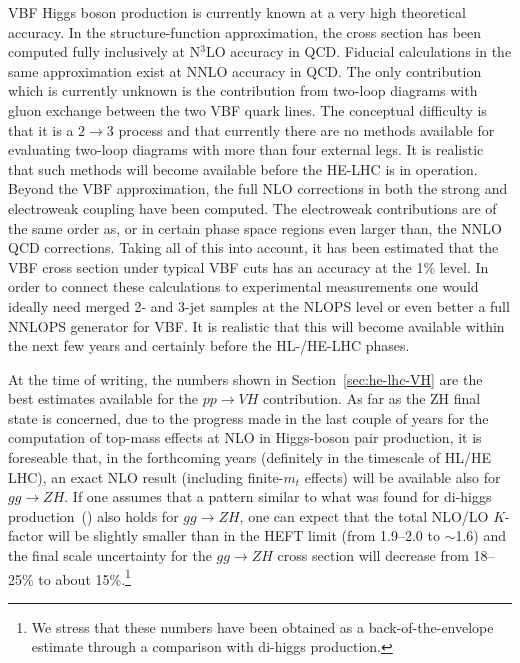VBF Higgs boson production is currently known at a very high theoretical accuracy. In
the structure-function approximation, the cross section has been computed fully inclusively at
N$^3$LO accuracy in QCD. Fiducial calculations in the same approximation exist at NNLO accuracy in QCD. The
only contribution which is currently unknown is the contribution from two-loop
diagrams with gluon exchange between the two VBF quark lines. The conceptual
difficulty is that it is a $2 \to 3$ process and that currently there are no methods
available for evaluating two-loop diagrams with more than four external legs. It is
realistic that such methods will become available before the HE-LHC is in
operation. Beyond the VBF approximation, the full NLO corrections in both the
strong and electroweak coupling have been computed. The electroweak
contributions are of the same order as, or in certain phase space regions even
larger than, the NNLO QCD corrections. Taking all of this into account, it has
been estimated that the VBF cross section under typical VBF cuts has an accuracy
at the 1\% level. In order to connect these calculations to experimental
measurements one would ideally need merged 2- and 3-jet samples at the NLOPS
level or even better a full NNLOPS generator for VBF. It is realistic that this
will become available within the next few years and certainly before the
HL-/HE-LHC phases.
 


\label{sec:hl-lhc-VH}
At the time of writing, the numbers shown in Section~\ref{sec:he-lhc-VH}
are the best estimates
available for the $pp\rightarrow VH$ contribution. As far as the ZH final state is concerned, due to the progress made in the
last couple of years for the computation of top-mass effects at NLO in
Higgs-boson pair production, it is foreseable that, in the forthcoming years
(definitely in the timescale of HL/HE LHC), an exact NLO result
(including finite-$m_t$ effects) will be available also for $gg\rightarrow ZH$. If
one assumes that a pattern similar to what was found for di-higgs
production~(\cite{Borowka:2016ypz}) also holds for $gg\rightarrow ZH$, one can expect
that the total NLO/LO $K$-factor will be slightly smaller than in the
HEFT limit (from 1.9--2.0 to $\sim$1.6) and the final scale uncertainty for
the $gg\rightarrow ZH$ cross section will decrease from 18--25\% to about 15\%.\footnote{We stress that these numbers have been obtained as a back-of-the-envelope estimate through a comparison with di-higgs production.}

